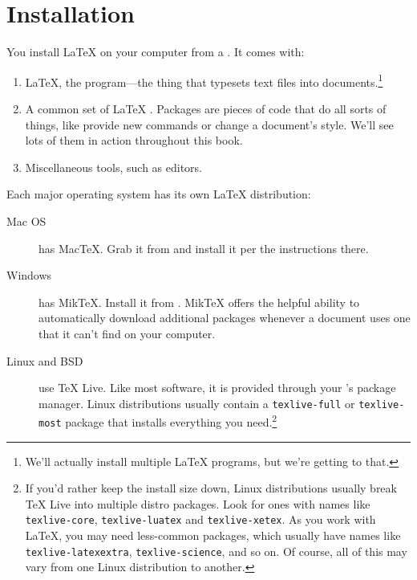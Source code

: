 \chapter{Installation}
\label{installation}

You install \LaTeX{} on your computer from a .
It comes with:
\begin{enumerate}
\item \LaTeX, the program---the thing that typesets text files into
    documents.\footnote{We'll actually install multiple \LaTeX{} programs,
    but we're getting to that.}
\item A common set of \LaTeX{} .
    Packages are pieces of code that do all sorts of things,
    like provide new commands or change a document's style.
    We'll see lots of them in action throughout this book.
\item Miscellaneous tools, such as editors.
\end{enumerate}
Each major operating system has its own \LaTeX{} distribution:
\begin{description}
\item[Mac OS] has Mac\TeX. Grab it from 
    and install it per the instructions there.

\item[Windows] has Mik\TeX.
    Install it from .
    Mik\TeX{} offers the helpful ability to automatically download
    additional packages whenever a document uses one that it can't find
    on your computer.

\item[Linux and BSD] use \TeX{} Live.
    Like most software, it is provided through your
    's package manager.
    Linux distributions usually contain a \texttt{texlive-\allowbreak full}
    or \texttt{texlive-\allowbreak most} package that installs everything
    you need.\punckern\footnote{%
    If you'd rather keep the install size down,
    Linux distributions usually break \TeX{} Live into multiple distro packages.
    Look for ones with names like
    \texttt{texlive-\allowbreak core}, \texttt{texlive-\allowbreak luatex}
    and \texttt{texlive-\allowbreak xetex}.
    As you work with \LaTeX, you may need less-common packages,
    which usually have names like \texttt{texlive-\allowbreak latexextra},
    \texttt{texlive-\allowbreak science}, and so on.
    Of course, all of this may vary from one Linux distribution to another.}
\end{description}

